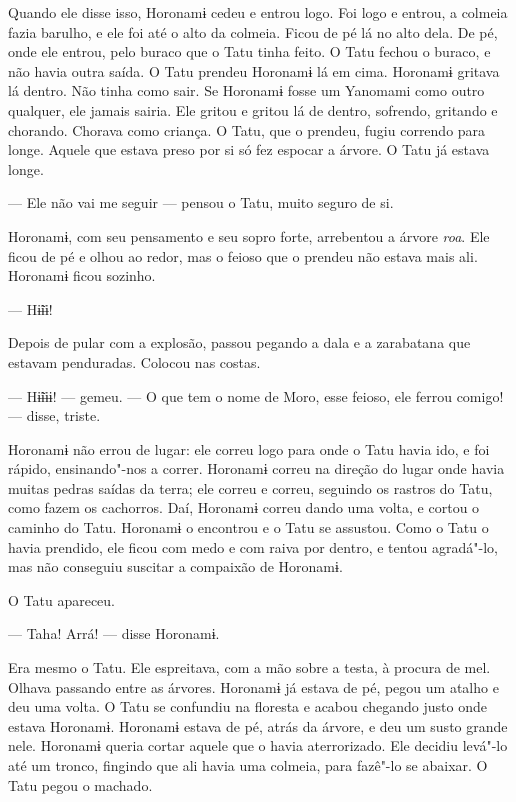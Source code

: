 Quando ele disse isso, Horonamɨ cedeu e entrou logo. Foi logo e entrou,
a colmeia fazia barulho, e ele foi até o alto da colmeia. Ficou de pé lá
no alto dela. De pé, onde ele entrou, pelo buraco que o Tatu tinha feito.
O Tatu fechou o buraco, e não havia outra saída. O Tatu prendeu Horonamɨ
lá em cima. Horonamɨ gritava lá dentro. Não tinha como sair. Se Horonamɨ
fosse um Yanomami como outro qualquer, ele jamais sairia. Ele gritou e
gritou lá de dentro, sofrendo, gritando e chorando. Chorava como
criança. O Tatu, que o prendeu, fugiu correndo para longe. Aquele que
estava preso por si só fez espocar a árvore. O Tatu já estava longe. 

--- Ele não vai me seguir --- pensou o Tatu, muito seguro de si. 

Horonamɨ, com seu pensamento e seu sopro forte, arrebentou a
árvore \emph{roa}. Ele ficou de pé e olhou ao redor, mas o feioso que o
prendeu não estava mais ali. Horonamɨ ficou sozinho. 

--- Hɨ̃ɨɨ! 

Depois de pular com a explosão, passou pegando a dala e a zarabatana que
estavam penduradas. Colocou nas costas. 

--- Hɨ̃ɨɨɨ! --- gemeu. --- O que tem o nome de Moro, esse feioso,
ele ferrou comigo! --- disse, triste.

Horonamɨ não errou de lugar: ele correu logo para onde o Tatu havia ido,
e foi rápido, ensinando"-nos a correr. Horonamɨ correu na direção do
lugar onde havia muitas pedras saídas da terra; ele correu e correu,
seguindo os rastros do Tatu, como fazem os cachorros. Daí, Horonamɨ
correu dando uma volta, e cortou o caminho do Tatu. Horonamɨ o
encontrou e o Tatu se assustou. Como o Tatu o havia prendido, ele ficou
com medo e com raiva por dentro, e tentou agradá"-lo, mas não conseguiu
suscitar a compaixão de Horonamɨ. 

O Tatu apareceu.

--- Taha! Arrá! --- disse Horonamɨ. 

Era mesmo o Tatu. Ele espreitava, com a mão sobre a testa, à procura de
mel. Olhava passando entre as árvores. Horonamɨ já estava de pé, pegou
um atalho e deu uma volta. O Tatu se confundiu na floresta e acabou
chegando justo onde estava Horonamɨ. Horonamɨ estava de pé, atrás da
árvore, e deu um susto grande nele. Horonamɨ queria cortar aquele que o
havia aterrorizado. Ele decidiu levá"-lo até um tronco, fingindo que ali
havia uma colmeia, para fazê"-lo se abaixar. O Tatu pegou o machado. 


